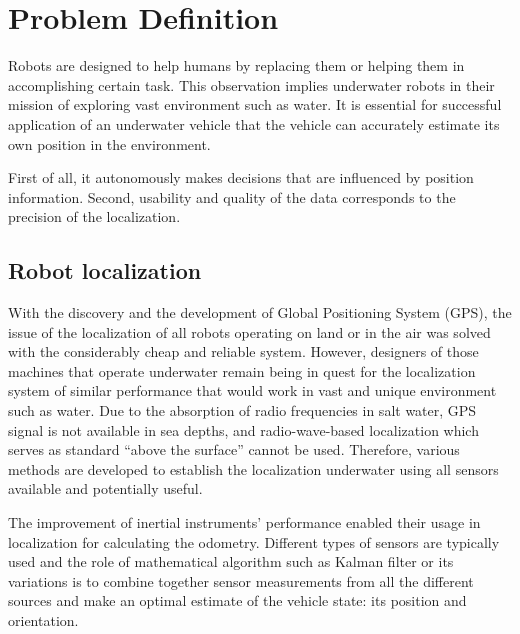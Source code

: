 \chapter{Problem Definition} \label{chap:problem-def}
Robots are designed to help humans by replacing them or helping them in accomplishing certain task. This observation implies underwater robots in their mission of exploring vast environment such as water. It is essential for successful application of an underwater vehicle that the vehicle can accurately estimate its own position in the environment.  

First of all, it autonomously makes decisions that are influenced by position information. Second, usability and quality of the data corresponds to the precision of the localization.
\section{Robot localization}
With the discovery and the development of Global Positioning System (GPS), the issue of the localization of all robots operating on land or in the air was solved with the considerably cheap and reliable system. However, designers of those machines that operate underwater remain being in quest for the localization system of similar performance that would work in vast and unique environment such as water. Due to the absorption of radio frequencies in salt water, GPS signal is not available in sea depths, and radio-wave-based localization which serves as standard ``above the surface'' cannot be used. Therefore, various methods are developed to establish the localization underwater using all sensors available and potentially useful. 

The improvement of inertial instruments' performance enabled their usage in localization for calculating the odometry. Different types of sensors are typically used and the role of mathematical algorithm such as Kalman filter or its variations is to combine together sensor measurements from all the different sources and make an optimal estimate of the vehicle state: its position and orientation. 

